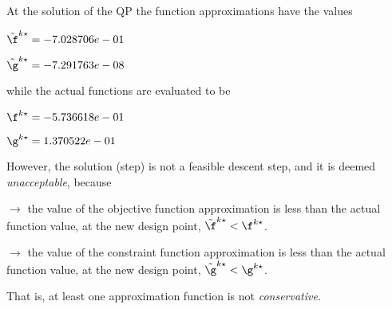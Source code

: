 At the solution of the QP the function approximations have the values

$\tilde \f^{k\star} = -7.028706e-01$

$\tilde \g^{k\star} = -7.291763e-08$

\bigskip
while the actual functions are evaluated to be

$\f^{k\star} = -5.736618e-01$

$\g^{k\star} =  1.370522e-01$

\bigskip
 However, the solution (step)                         is not a feasible descent step, and it is deemed                         \emph{unacceptable}, because 
 
$\to$ the value of the objective                             function approximation is less than the actual function                             value, at the new design point,                             $\tilde {\f}^{k\star} < {\f}^{k\star}$.

 $\to$ the value of the constraint function                             approximation is less than the actual function value, at                             the new design point, $\tilde {\g}^{k\star} < {\g}^{k\star}$.

 \bigskip 

 That is, at least one approximation                         function is not \emph{conservative}.
